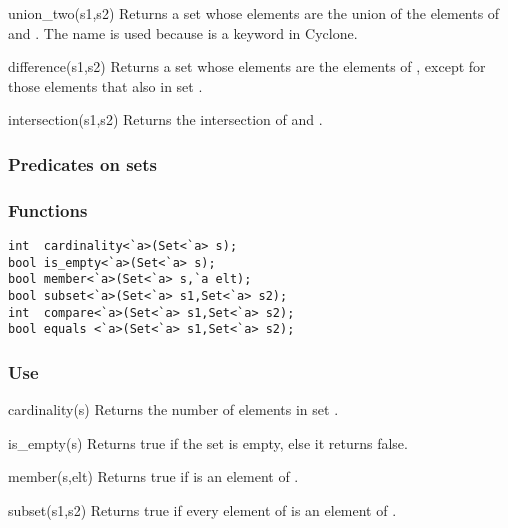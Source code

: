 \begin{defun}{union_two}{(s1,s2)}
Returns a set whose elements are the union of the elements of 
and .  The name  is used because  is
a keyword in Cyclone.
\end{defun}

\begin{defun}{difference}{(s1,s2)}
Returns a set whose elements are the elements of , except for
those elements that also in set .
\end{defun}

\begin{defun}{intersection}{(s1,s2)}
Returns the intersection of  and .
\end{defun}

\subsubsection*{Predicates on sets}
\subsubsection*{Functions}
\begin{verbatim}
int  cardinality<`a>(Set<`a> s);
bool is_empty<`a>(Set<`a> s);
bool member<`a>(Set<`a> s,`a elt);
bool subset<`a>(Set<`a> s1,Set<`a> s2);
int  compare<`a>(Set<`a> s1,Set<`a> s2);
bool equals <`a>(Set<`a> s1,Set<`a> s2);
\end{verbatim}

\subsubsection*{Use}

\begin{defun}{cardinality}{(s)}
Returns the number of elements in set .
\end{defun}

\begin{defun}{is_empty}{(s)}
Returns true if the set  is empty, else it returns false.
\end{defun}

\begin{defun}{member}{(s,elt)}
Returns true if  is an element of .
\end{defun}

\begin{defun}{subset}{(s1,s2)}
Returns true if every element of  is an element of .
\end{defun}

